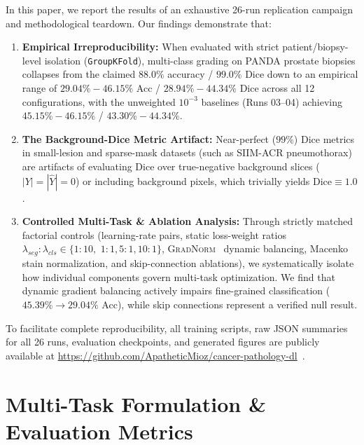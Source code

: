 \documentclass[runningheads]{llncs}
\begin{document}
In this paper, we report the results of an exhaustive 26-run replication campaign and methodological teardown. Our findings demonstrate that:
\begin{enumerate}
    \item \textbf{Empirical Irreproducibility:} When evaluated with strict patient/biopsy-level isolation (\texttt{GroupKFold}), multi-class grading on PANDA prostate biopsies collapses from the claimed $88.0\%$ accuracy / $99.0\%$ Dice down to an empirical range of $29.04\%-46.15\%$ Acc / $28.94\%-44.34\%$ Dice across all 12 configurations, with the unweighted $10^{-3}$ baselines (Runs 03--04) achieving $45.15\%-46.15\%$ / $43.30\%-44.34\%$.
    \item \textbf{The Background-Dice Metric Artifact:} Near-perfect ($99\%$) Dice metrics in small-lesion and sparse-mask datasets (such as SIIM-ACR pneumothorax) are artifacts of evaluating Dice over true-negative background slices ($|Y| = |\hat{Y}| = 0$) or including background pixels, which trivially yields $\text{Dice} \equiv 1.0$.
    \item \textbf{Controlled Multi-Task \& Ablation Analysis:} Through strictly matched factorial controls (learning-rate pairs, static loss-weight ratios $\lambda_{seg}:\lambda_{cls} \in \{1{:}10,$ $1{:}1, 5{:}1, 10{:}1\}$, \textsc{GradNorm}~\cite{chen2018gradnorm} dynamic balancing, Macenko stain normalization, and skip-connection ablations), we systematically isolate how individual components govern multi-task optimization. We find that dynamic gradient balancing actively impairs fine-grained classification ($45.39\% \to 29.04\%$ Acc), while skip connections represent a verified null result.
\end{enumerate}

To facilitate complete reproducibility, all training scripts, raw JSON summaries for all 26 runs, evaluation checkpoints, and generated figures are publicly available at \url{https://github.com/ApatheticMioz/cancer-pathology-dl}~\cite{ali2026cancerpathologydl}.

\section{Multi-Task Formulation \& Evaluation Metrics}
\end{document}
